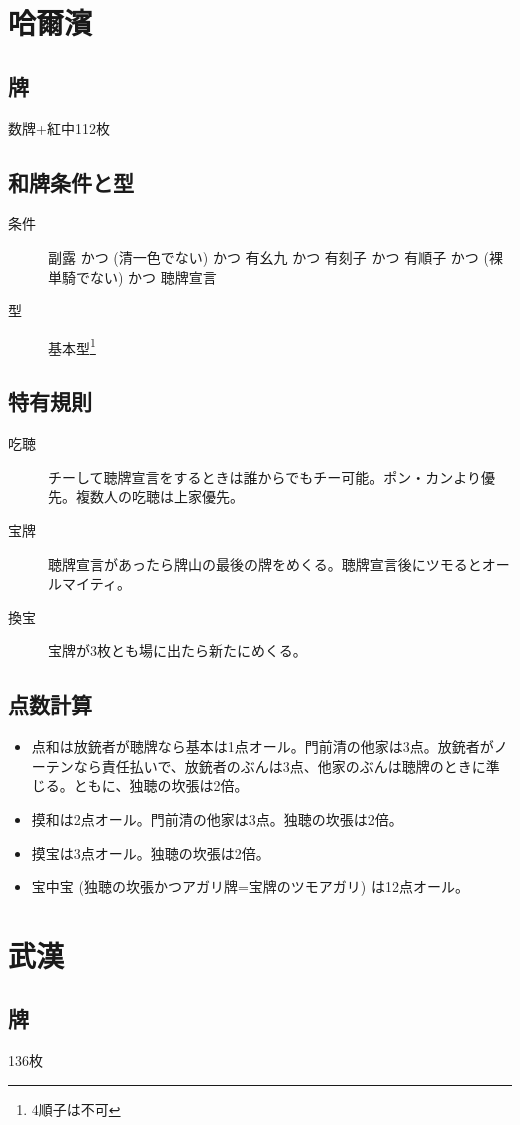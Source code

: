 \documentclass{ltjsarticle}
\begin{document}
\section{哈爾濱}
\subsection{牌}数牌+紅中112枚
\subsection{和牌条件と型}
\begin{description}
    \item[条件] 副露 かつ (清一色でない) かつ 有幺九 かつ 有刻子 かつ 有順子 かつ (裸単騎でない) かつ 聴牌宣言
    \item[型] 基本型\footnote{4順子は不可}
\end{description}
\subsection{特有規則}
\begin{description}
    \item[吃聴] チーして聴牌宣言をするときは誰からでもチー可能。ポン・カンより優先。複数人の吃聴は上家優先。
    \item[宝牌] 聴牌宣言があったら牌山の最後の牌をめくる。聴牌宣言後にツモるとオールマイティ。
    \item[換宝] 宝牌が3枚とも場に出たら新たにめくる。
\end{description}
\subsection{点数計算}
\begin{itemize}
    \item 点和は放銃者が聴牌なら基本は1点オール。門前清の他家は3点。放銃者がノーテンなら責任払いで、放銃者のぶんは3点、他家のぶんは聴牌のときに準じる。ともに、独聴の坎張は2倍。
    \item 摸和は2点オール。門前清の他家は3点。独聴の坎張は2倍。
    \item 摸宝は3点オール。独聴の坎張は2倍。
    \item 宝中宝 (独聴の坎張かつアガリ牌=宝牌のツモアガリ) は12点オール。
\end{itemize}
\section{武漢}
\subsection{牌}136枚
\end{document}
